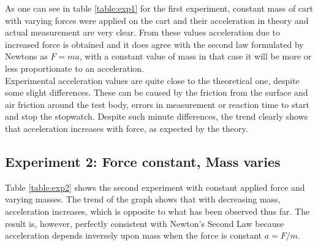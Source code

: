 \documentclass[a4paper,12pt]{article}
\begin{document}
As one can see in table \ref{table:exp1} for the first experiment, constant mass of cart with varying forces were applied on the cart and their acceleration in theory and actual measurement are very clear. From these values acceleration due to increased force is obtained and it does agree with the second law formulated by Newtons as \( F = ma \), with a constant value of mass in that case it will be more or less proportionate to an acceleration. \\

Experimental acceleration values are quite close to the theoretical one, despite some slight differences. These can be caused by the friction from the surface and air friction around the test body, errors in measurement or reaction time to start and stop the stopwatch. Despite such minute differences, the trend clearly shows that acceleration increases with force, as expected by the theory.

\subsection{Experiment 2: Force constant, Mass varies}
\begin{table}[h]
    \centering
    \renewcommand{\arraystretch}{1.2}
    \caption{Results for Experiment 2: Force constant, Mass varies}
    \label{table:exp2}
\end{table}


Table \ref{table:exp2} shows the second experiment with constant applied force and varying masses. The trend of the graph shows that with decreasing mass, acceleration increases, which is opposite to what has been observed thus far. The result is, however, perfectly consistent with Newton's Second Law because acceleration depends inversely upon mass when the force is constant \( a = F/m \). \\
\end{document}
